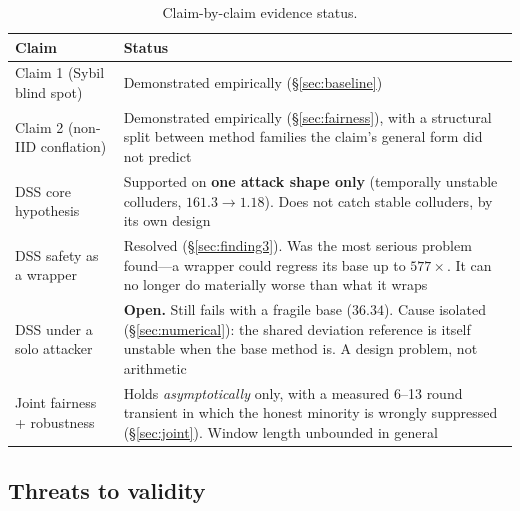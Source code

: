 \documentclass[11pt,a4paper]{article}
\begin{document}
\begin{table}[htbp]
\centering
\small
\caption{Claim-by-claim evidence status.}
\label{tab:status}
\begin{tabular}{p{} p{}}
\toprule
\textbf{Claim} & \textbf{Status} \\
\midrule
Claim 1 (Sybil blind spot) & Demonstrated empirically
(\S\ref{sec:baseline}) \\
Claim 2 (non-IID conflation) & Demonstrated empirically
(\S\ref{sec:fairness}), with a structural split between method families
the claim's general form did not predict \\
DSS core hypothesis & Supported on \textbf{one attack shape only}
(temporally unstable colluders, $161.3 \rightarrow 1.18$). Does not catch
stable colluders, by its own design \\
DSS safety as a wrapper & Resolved (\S\ref{sec:finding3}). Was the most
serious problem found---a wrapper could regress its base up to
$577\times$. It can no longer do materially worse than what it wraps \\
DSS under a solo attacker & \textbf{Open.} Still fails with a fragile base
($36.34$). Cause isolated (\S\ref{sec:numerical}): the shared deviation
reference is itself unstable when the base method is. A design problem,
not arithmetic \\
Joint fairness + robustness & Holds \emph{asymptotically} only, with a
measured 6--13 round transient in which the honest minority is wrongly
suppressed (\S\ref{sec:joint}). Window length unbounded in general \\
\bottomrule
\end{tabular}
\end{table}

\subsection{Threats to validity}
\end{document}
